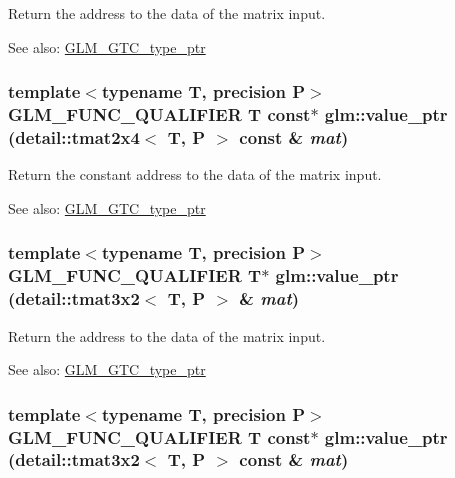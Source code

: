 Return the address to the data of the matrix input. \begin{Desc}
\item[See also:]\hyperlink{group__gtc__type__ptr}{GLM\_\-GTC\_\-type\_\-ptr} \end{Desc}
\hypertarget{group__gtc__type__ptr_g9efd0cc6b3e12ec8953d9a96e8b750b0}{
\subsubsection[value\_\-ptr]{\setlength{\rightskip}{0pt plus 5cm}template$<$typename T, precision P$>$ GLM\_\-FUNC\_\-QUALIFIER T const$\ast$ glm::value\_\-ptr (detail::tmat2x4$<$ T, P $>$ const \& {\em mat})}}
\label{group__gtc__type__ptr_g9efd0cc6b3e12ec8953d9a96e8b750b0}


Return the constant address to the data of the matrix input. \begin{Desc}
\item[See also:]\hyperlink{group__gtc__type__ptr}{GLM\_\-GTC\_\-type\_\-ptr} \end{Desc}
\hypertarget{group__gtc__type__ptr_gd4e46790704d514a05d86164af942d72}{
\subsubsection[value\_\-ptr]{\setlength{\rightskip}{0pt plus 5cm}template$<$typename T, precision P$>$ GLM\_\-FUNC\_\-QUALIFIER T$\ast$ glm::value\_\-ptr (detail::tmat3x2$<$ T, P $>$ \& {\em mat})}}
\label{group__gtc__type__ptr_gd4e46790704d514a05d86164af942d72}


Return the address to the data of the matrix input. \begin{Desc}
\item[See also:]\hyperlink{group__gtc__type__ptr}{GLM\_\-GTC\_\-type\_\-ptr} \end{Desc}
\hypertarget{group__gtc__type__ptr_g3ad2904b61a8c3fe50ccb6222e6e928c}{
\subsubsection[value\_\-ptr]{\setlength{\rightskip}{0pt plus 5cm}template$<$typename T, precision P$>$ GLM\_\-FUNC\_\-QUALIFIER T const$\ast$ glm::value\_\-ptr (detail::tmat3x2$<$ T, P $>$ const \& {\em mat})}}
\label{group__gtc__type__ptr_g3ad2904b61a8c3fe50ccb6222e6e928c}


